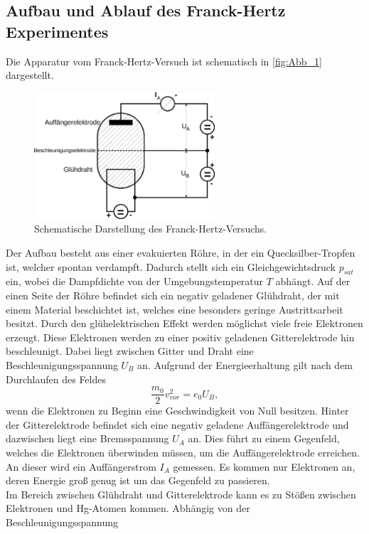 \subsection{Aufbau und Ablauf des Franck-Hertz Experimentes}
\label{subsec:AufAbTheo}
Die Apparatur vom Franck-Hertz-Versuch ist schematisch in \autoref{fig:Abb_1} dargestellt.
\begin{figure}[H]
    \centering
    \includegraphics[width=0.6\textwidth]{build/Abb_1.png}
    \caption{Schematische Darstellung des Franck-Hertz-Versuchs\cite{V601}.}
    \label{fig:Abb_1}
\end{figure}
Der Aufbau besteht aus einer evakuierten Röhre, in der ein Quecksilber-Tropfen ist, welcher spontan verdampft. Dadurch stellt sich ein 
Gleichgewichtsdruck $p_{s\ddot{a}t}$ ein, wobei die Dampfdichte von der Umgebungstemperatur $T$ abhängt.
Auf der einen Seite der Röhre befindet sich ein negativ geladener Glühdraht, der mit einem Material beschichtet ist, welches eine besonders geringe
Austrittsarbeit besitzt. Durch den glühelektrischen Effekt werden möglichst viele freie Elektronen erzeugt.
Diese Elektronen werden zu einer positiv geladenen Gitterelektrode hin beschleunigt. Dabei liegt zwischen Gitter und Draht eine Beschleunigungsspannung
$U_B$ an. Aufgrund der Energieerhaltung gilt nach dem Durchlaufen des Feldes
\begin{equation*}
    \frac{m_0}{2} v^2_{vor} = e_0 U_B,
\end{equation*}
wenn die Elektronen zu Beginn eine Geschwindigkeit von Null besitzen.
Hinter der Gitterelektrode befindet sich eine negativ geladene Auffängerelektrode und dazwischen liegt eine Bremsspannung $U_A$ an.
Dies führt zu einem Gegenfeld, welches die Elektronen überwinden müssen, um die Auffängerelektrode erreichen. An dieser wird ein Auffängerstrom
$I_A$ gemessen. Es kommen nur Elektronen an, deren Energie groß genug ist um das Gegenfeld zu passieren.\\
Im Bereich zwischen Glühdraht und Gitterelektrode kann es zu Stößen zwischen Elektronen und Hg-Atomen kommen. Abhängig von der Beschleunigungsspannung
